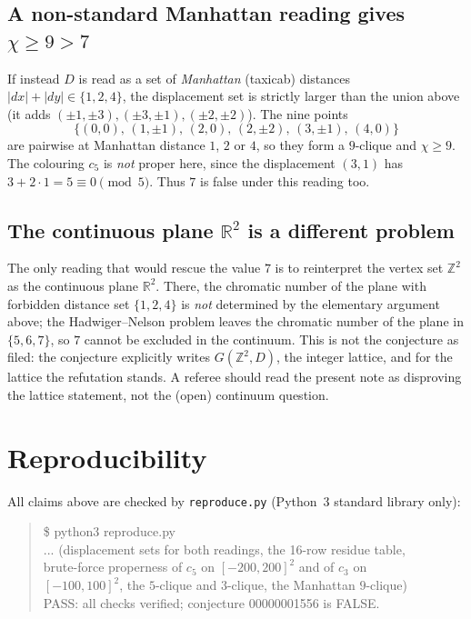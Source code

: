 \documentclass[11pt]{article}
\theoremstyle{definition}
\theoremstyle{remark}
\newcommand{\Z}{\mathbb{Z}}
\newcommand{\R}{\mathbb{R}}
\newcommand{\chiG}{\chi}
\begin{document}
\subsection*{A non-standard Manhattan reading gives $\chiG \ge 9 > 7$}

If instead $D$ is read as a set of \emph{Manhattan} (taxicab) distances
$|dx|+|dy| \in \{1,2,4\}$, the displacement set is strictly larger than the
union above (it adds $(\pm1,\pm3),(\pm3,\pm1),(\pm2,\pm2)$). The nine points
\[
  \{(0,0),\,(1,\pm1),\,(2,0),\,(2,\pm2),\,(3,\pm1),\,(4,0)\}
\]
are pairwise at Manhattan distance $1$, $2$ or $4$, so they form a $9$-clique
and $\chiG \ge 9$. The colouring $c_5$ is \emph{not} proper here, since the
displacement $(3,1)$ has $3+2\cdot1=5\equiv0 \pmod 5$. Thus $7$ is false under
this reading too.

\subsection*{The continuous plane $\R^2$ is a different problem}

The only reading that would rescue the value $7$ is to reinterpret the vertex
set $\Z^2$ as the continuous plane $\R^2$. There, the chromatic number of the
plane with forbidden distance set $\{1,2,4\}$ is \emph{not} determined by the
elementary argument above; the Hadwiger--Nelson problem leaves the chromatic
number of the plane in $\{5,6,7\}$, so $7$ cannot be excluded in the continuum.
This is not the conjecture as filed: the conjecture explicitly writes
$G(\Z^2,D)$, the integer lattice, and for the lattice the refutation stands.
A referee should read the present note as disproving the lattice statement, not
the (open) continuum question.

\section{Reproducibility}

All claims above are checked by \texttt{reproduce.py} (Python~3 standard library
only):

\begin{quote}\ttfamily
\$ python3 reproduce.py\\
... (displacement sets for both readings, the 16-row residue table,\\
brute-force properness of $c_5$ on $[-200,200]^2$ and of $c_3$ on\\
$[-100,100]^2$, the $5$-clique and $3$-clique, the Manhattan $9$-clique)\\
PASS: all checks verified; conjecture 00000001556 is FALSE.
\end{quote}
\end{document}

